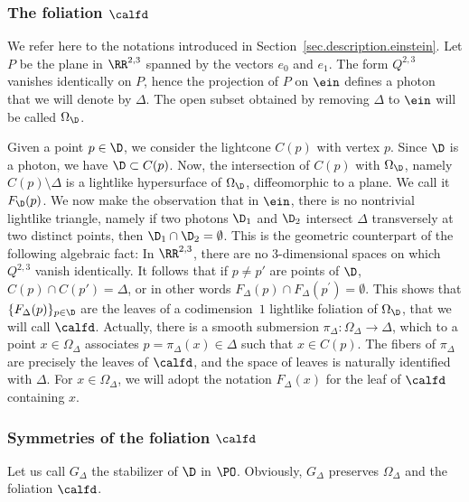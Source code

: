 \subsubsection{The foliation \texorpdfstring{$\calfd$}{calfd}}\label{sec.foliation-einstein}
We refer here to the notations introduced in Section~\ref{sec.description.einstein}. Let $P$ be the plane in $\RR^{2,3}$ spanned by the vectors $e_0$ and $e_1$. The form $Q^{2,3}$ vanishes identically on $P$, hence the projection of $P$ on $\ein$ defines a photon that we will denote by $\Delta$. The open subset obtained by removing $\Delta$ to $\ein$ will be called $\Omega_{\D}$.

Given a point $p \in \D$, we consider the lightcone $C(p)$ with vertex $p$. Since $\D$ is a photon, we have $\D \subset C(p)$. Now, the intersection of $C(p)$ with $\Omega_{\D}$, namely $C(p) \setminus \Delta$ is a lightlike hypersurface of $\Omega_{\D}$, diffeomorphic to a plane. We call it $F_{\D}(p)$. We now make the observation that in $\ein$, there is no nontrivial lightlike triangle, namely if two photons $\D_1$ and $\D_2$ intersect $\Delta$ transversely at two distinct points, then $\D_1 \cap \D_2 = \emptyset$. This is the geometric counterpart of the following algebraic fact: In $\RR^{2,3}$, there are no $3$-dimensional spaces on which $Q^{2,3}$ vanish identically. It follows that if $p \not= p'$ are points of $\D$, $C(p) \cap C(p')=\Delta$, or in other words $F_{\Delta}(p) \cap F_{\Delta}(p^{\prime}) = \emptyset$. This shows that $\{ F_{\Delta}(p) \}_{p \in \D}$ are the leaves of a codimension~$1$ lightlike foliation of $\Omega_{\D}$, that we will call $\calfd$. Actually, there is a smooth submersion $\pi_{\Delta} : \Omega_{\Delta} \to \Delta$, which to a point $x \in \Omega_{\Delta}$ associates $p=\pi_{\Delta}(x) \in \Delta$ such that $x \in C(p)$. The fibers of $\pi_{\Delta}$ are precisely the leaves of $\calfd$, and the space of leaves is naturally identified with $\Delta$. For $x \in \Omega_{\Delta}$, we will adopt the notation $F_{\Delta}(x)$ for the leaf of $\calfd$ containing $x$.

\subsubsection{Symmetries of the foliation \texorpdfstring{$\calfd$}{calfd}}\label{sec.symetries}
Let us call $G_{\Delta}$ the stabilizer of $\D$ in $\PO$. Obviously, $G_{\Delta}$ preserves $\Omega_{\Delta}$ and the foliation $\calfd$.

